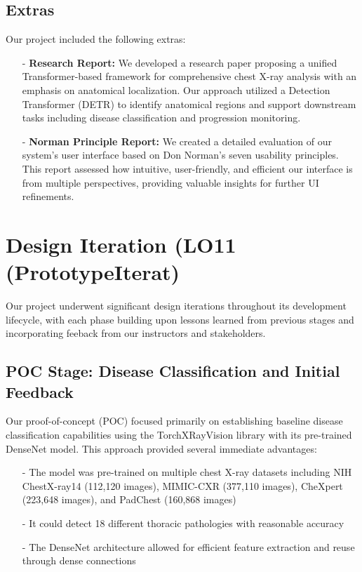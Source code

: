 \documentclass{article}
\begin{document}
\subsection{Extras}

Our project included the following extras:

\begin{itemize}
    \item[-] \textbf{Research Report:} We developed a research paper proposing a unified Transformer-based framework for comprehensive chest X-ray analysis with an emphasis on anatomical localization. Our approach utilized a Detection Transformer (DETR) to identify anatomical regions and support downstream tasks including disease classification and progression monitoring.
    
    \item[-] \textbf{Norman Principle Report:} We created a detailed evaluation of our system's user interface based on Don Norman's seven usability principles. This report assessed how intuitive, user-friendly, and efficient our interface is from multiple perspectives, providing valuable insights for further UI refinements.

\end{itemize}


\section{Design Iteration (LO11 (PrototypeIterat)}

Our project underwent significant design iterations throughout its development lifecycle, with each phase building upon lessons learned from previous stages and incorporating feeback from our instructors and stakeholders.

\subsection{POC Stage: Disease Classification and Initial Feedback}

Our proof-of-concept (POC) focused primarily on establishing baseline disease classification capabilities using the TorchXRayVision library with its pre-trained DenseNet model. This approach provided several immediate advantages:

\begin{itemize}
    \item[-] The model was pre-trained on multiple chest X-ray datasets including NIH ChestX-ray14 (112,120 images), MIMIC-CXR (377,110 images), CheXpert (223,648 images), and PadChest (160,868 images)
    \item[-] It could detect 18 different thoracic pathologies with reasonable accuracy
    \item[-] The DenseNet architecture allowed for efficient feature extraction and reuse through dense connections
\end{itemize}
\end{document}
